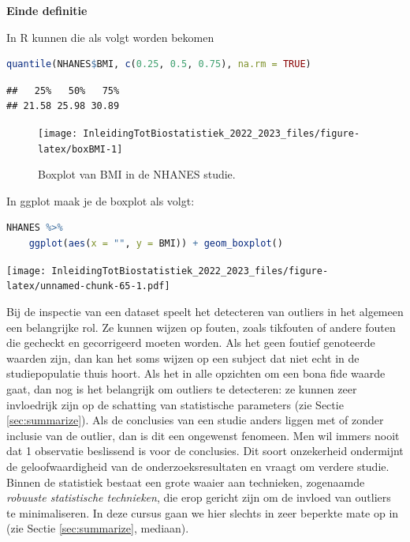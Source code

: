 \documentclass[
  12pt,dutch,coursenotes]{book}
\begin{document}
\textbf{Einde definitie}

In R kunnen die als volgt worden bekomen

\begin{lstlisting}[language=R]
quantile(NHANES$BMI, c(0.25, 0.5, 0.75), na.rm = TRUE)
\end{lstlisting}

\begin{lstlisting}
##   25%   50%   75% 
## 21.58 25.98 30.89
\end{lstlisting}

\begin{figure}

{\centering \texttt{[image: InleidingTotBiostatistiek\_2022\_2023\_files/figure-latex/boxBMI-1]} 

}

\caption{Boxplot van BMI in de NHANES studie.}\label{fig:boxBMI}
\end{figure}

In ggplot maak je de boxplot als volgt:

\begin{lstlisting}[language=R]
NHANES %>%
    ggplot(aes(x = "", y = BMI)) + geom_boxplot()
\end{lstlisting}

\texttt{[image: InleidingTotBiostatistiek\_2022\_2023\_files/figure-latex/unnamed-chunk-65-1.pdf]}

Bij de inspectie van een dataset speelt het detecteren van outliers in het
algemeen een belangrijke rol. Ze kunnen wijzen op fouten, zoals tikfouten of
andere fouten die gecheckt en gecorrigeerd moeten worden. Als het geen
foutief genoteerde waarden zijn, dan kan het soms wijzen op een subject dat niet
echt in de studiepopulatie thuis hoort. Als het in
alle opzichten om een bona fide waarde gaat, dan nog is het belangrijk om
outliers te detecteren: ze kunnen zeer invloedrijk zijn op de schatting van
statistische parameters (zie Sectie \ref{sec:summarize}). Als de conclusies
van een studie anders liggen met of zonder inclusie van de outlier, dan is
dit een ongewenst fenomeen. Men wil immers nooit dat 1 observatie beslissend
is voor de conclusies. Dit soort onzekerheid ondermijnt de geloofwaardigheid
van de onderzoeksresultaten en vraagt om verdere studie. Binnen de
statistiek bestaat een grote waaier aan technieken, zogenaamde
\emph{robuuste statistische technieken}, die erop gericht zijn om de invloed van
outliers te minimaliseren. In deze cursus gaan we hier slechts in zeer
beperkte mate op in (zie Sectie \ref{sec:summarize}, mediaan).
\end{document}
